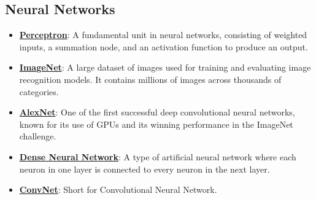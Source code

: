 \documentclass{article}%
\begin{document}
%
\subsection{Neural Networks}%
\label{subsec:NeuralNetworks}%
\begin{itemize}[leftmargin=*]%
\item \href{https://purdue.brightspace.com/d2l/common/assets/pdfjs-d2l-dist/1.0.14-legacy/web/viewer.html?file=\%2Fcontent\%2Fenforced\%2F1095467-wl.202510.CS.24300.001\%2F02L2-Intro.pdf\%3Fou\%3D1095467\&lang=en-us\&container=d2l-fileviewer-rendered-pdf\&fullscreen=d2l-fileviewer-rendered-pdf-dialog\&height=667#page=45}{\textbf{Perceptron}}: A fundamental unit in neural networks, consisting of weighted inputs, a summation node, and an activation function to produce an output.%
\item \href{https://purdue.brightspace.com/d2l/common/assets/pdfjs-d2l-dist/1.0.14-legacy/web/viewer.html?file=\%2Fcontent\%2Fenforced\%2F1095467-wl.202510.CS.24300.001\%2F09L1-cnn.pdf\%3Fou\%3D1095467\&lang=en-us\&container=d2l-fileviewer-rendered-pdf\&fullscreen=d2l-fileviewer-rendered-pdf-dialog\&height=667#page=3}{\textbf{ImageNet}}: A large dataset of images used for training and evaluating image recognition models. It contains millions of images across thousands of categories.%
\item \href{https://purdue.brightspace.com/d2l/common/assets/pdfjs-d2l-dist/1.0.14-legacy/web/viewer.html?file=\%2Fcontent\%2Fenforced\%2F1095467-wl.202510.CS.24300.001\%2F09L1-cnn.pdf\%3Fou\%3D1095467\&lang=en-us\&container=d2l-fileviewer-rendered-pdf\&fullscreen=d2l-fileviewer-rendered-pdf-dialog\&height=667#page=3}{\textbf{AlexNet}}: One of the first successful deep convolutional neural networks, known for its use of GPUs and its winning performance in the ImageNet challenge.%
\item \href{https://purdue.brightspace.com/d2l/common/assets/pdfjs-d2l-dist/1.0.14-legacy/web/viewer.html?file=\%2Fcontent\%2Fenforced\%2F1095467-wl.202510.CS.24300.001\%2F09L1-cnn.pdf\%3Fou\%3D1095467\&lang=en-us\&container=d2l-fileviewer-rendered-pdf\&fullscreen=d2l-fileviewer-rendered-pdf-dialog\&height=667#page=4}{\textbf{Dense Neural Network}}: A type of artificial neural network where each neuron in one layer is connected to every neuron in the next layer.%
\item \href{https://purdue.brightspace.com/d2l/common/assets/pdfjs-d2l-dist/1.0.14-legacy/web/viewer.html?file=\%2Fcontent\%2Fenforced\%2F1095467-wl.202510.CS.24300.001\%2F09L1-cnn.pdf\%3Fou\%3D1095467\&lang=en-us\&container=d2l-fileviewer-rendered-pdf\&fullscreen=d2l-fileviewer-rendered-pdf-dialog\&height=667#page=4}{\textbf{ConvNet}}: Short for Convolutional Neural Network.%

\end{itemize}
\end{document}
